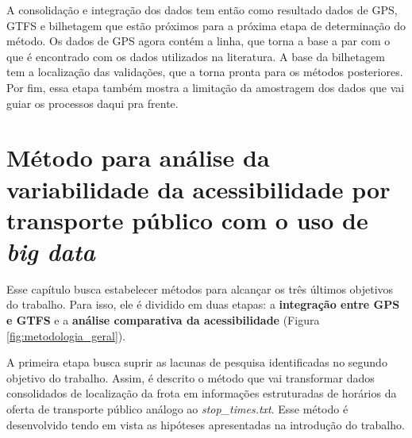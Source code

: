 \documentclass[        
    a4paper,          %
    12pt,             %
    chapter=TITLE,    %
    section=Title,    %
    subsection=Title, %
    oneside,          %
    english,          %
    spanish,          %
    brazil,           %
    fleqn             %
]{abntex2}
\begin{document}
  A consolidação e integração dos dados tem então como resultado dados de GPS, GTFS e bilhetagem que estão próximos para a próxima etapa de determinação do método. Os dados de GPS agora contém a linha, que torna a base a par com o que é encontrado com os dados utilizados na literatura. A base da bilhetagem tem a localização das validações, que a torna pronta para os métodos posteriores. Por fim, essa etapa também mostra a limitação da amostragem dos dados que vai guiar os processos daqui pra frente.
  
  \hypertarget{metodo-para-analise-da-variabilidade-da-acessibilidade-por-transporte-publico-com-o-uso-de-big-data}{%
  \chapter{\texorpdfstring{Método para análise da variabilidade da acessibilidade por transporte público com o uso de \emph{big data}}{Método para análise da variabilidade da acessibilidade por transporte público com o uso de big data}}\label{metodo-para-analise-da-variabilidade-da-acessibilidade-por-transporte-publico-com-o-uso-de-big-data}}
  
  Esse capítulo busca estabelecer métodos para alcançar os três últimos objetivos do trabalho. Para isso, ele é dividido em duas etapas: a \textbf{integração entre GPS e GTFS} e a \textbf{análise comparativa da acessibilidade} (Figura \ref{fig:metodologia_geral}).
  
  \begin{figure}[!h]
  \captionsetup{width=16cm}
  \centering
  \end{figure}
  
  A primeira etapa busca suprir as lacunas de pesquisa identificadas no segundo objetivo do trabalho. Assim, é descrito o método que vai transformar dados consolidados de localização da frota em informações estruturadas de horários da oferta de transporte público análogo ao \emph{stop\_times.txt}. Esse método é desenvolvido tendo em vista as hipóteses apresentadas na introdução do trabalho.
  
\end{document}
